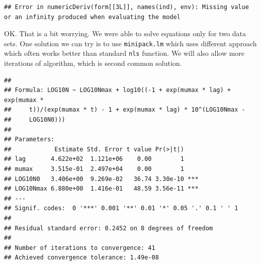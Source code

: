 \documentclass[]{book}
\newenvironment{Shaded}{\begin{snugshade}}{\end{snugshade}}
\newcommand{\KeywordTok}[1]{\textcolor[rgb]{0.13,0.29,0.53}{\textbf{#1}}}
\newcommand{\DataTypeTok}[1]{\textcolor[rgb]{0.13,0.29,0.53}{#1}}
\newcommand{\DecValTok}[1]{\textcolor[rgb]{0.00,0.00,0.81}{#1}}
\newcommand{\FloatTok}[1]{\textcolor[rgb]{0.00,0.00,0.81}{#1}}
\newcommand{\StringTok}[1]{\textcolor[rgb]{0.31,0.60,0.02}{#1}}
\newcommand{\OperatorTok}[1]{\textcolor[rgb]{0.81,0.36,0.00}{\textbf{#1}}}
\newcommand{\NormalTok}[1]{#1}
\theoremstyle{definition}
\theoremstyle{definition}
\theoremstyle{definition}
\theoremstyle{remark}
\begin{document}
\begin{verbatim}
## Error in numericDeriv(form[[3L]], names(ind), env): Missing value or an infinity produced when evaluating the model
\end{verbatim}

\begin{Shaded}
\end{Shaded}

OK. That is a bit worrying. We were able to solve equations only for two
data sets. One solution we can try is to use \texttt{minipack.lm} which
uses different approach which often works better than standard
\texttt{nls} function. We will also allow more iterations of algorithm,
which is second common solution.

\begin{Shaded}
\end{Shaded}

\begin{verbatim}
## 
## Formula: LOG10N ~ LOG10Nmax + log10((-1 + exp(mumax * lag) + exp(mumax * 
##     t))/(exp(mumax * t) - 1 + exp(mumax * lag) * 10^(LOG10Nmax - 
##     LOG10N0)))
## 
## Parameters:
##            Estimate Std. Error t value Pr(>|t|)    
## lag       4.622e+02  1.121e+06    0.00        1    
## mumax     3.515e-01  2.497e+04    0.00        1    
## LOG10N0   3.406e+00  9.269e-02   36.74 3.30e-10 ***
## LOG10Nmax 6.880e+00  1.416e-01   48.59 3.56e-11 ***
## ---
## Signif. codes:  0 '***' 0.001 '**' 0.01 '*' 0.05 '.' 0.1 ' ' 1
## 
## Residual standard error: 0.2452 on 8 degrees of freedom
## 
## Number of iterations to convergence: 41 
## Achieved convergence tolerance: 1.49e-08
\end{verbatim}
\end{document}
